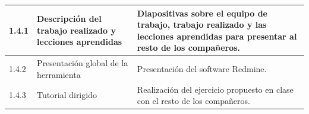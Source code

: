 \documentclass[a4paper,10pt]{scrartcl}
\begin{document}
\begin{table}[H]
{\begin{tabular}{|l|l|l|}
		1.4.1  & Descripción del trabajo realizado y lecciones aprendidas & Diapositivas sobre el equipo de trabajo, trabajo realizado y las lecciones aprendidas para presentar al resto de los compañeros. \\ \hline
		1.4.2  & Presentación global de la herramienta & Presentación del software Redmine. \\ \hline
		1.4.3  & Tutorial dirigido & Realización del ejercicio propuesto en clase con el resto de los compañeros. \\ \hline
	\end{tabular}
}
\end{table}



\end{document}
